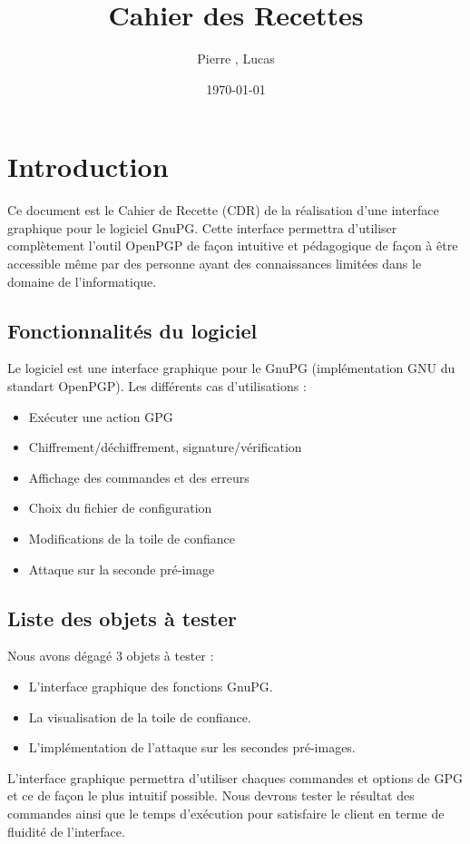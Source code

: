 \documentclass{../res/univ-projet}
\title{Cahier des Recettes}
\author{Pierre \bsc{Balmelle}, Lucas \bsc{Barbay}}
\date{\today}
\begin{document}
\maketitle
\newpage
\tableofcontents
\newpage

\section{Introduction}

Ce document est le Cahier de Recette (CDR) de la réalisation d'une interface graphique pour le logiciel GnuPG.
Cette interface permettra d'utiliser complètement l'outil OpenPGP de façon intuitive et pédagogique de façon 
à être accessible même par des personne ayant des connaissances limitées dans le domaine de l'informatique. 

\subsection{Fonctionnalités du logiciel}
Le logiciel est une interface graphique pour le GnuPG (implémentation GNU du standart OpenPGP).
Les différents cas d'utilisations :
\begin{itemize}
 \item Exécuter une action GPG
 \item Chiffrement/déchiffrement, signature/vérification
 \item Affichage des commandes et des erreurs
 \item Choix du fichier de configuration
 \item Modifications de la toile de confiance
 \item Attaque sur la seconde pré-image
\end{itemize}

\subsection{Liste des objets à tester}
Nous avons dégagé 3 objets à tester : 
\begin{itemize}
 \item L'interface graphique des fonctions GnuPG.
 \item La visualisation de la toile de confiance.
 \item L'implémentation de l'attaque sur les secondes pré-images. 
\end{itemize}

L'interface graphique permettra d'utiliser chaques commandes et options de GPG et ce de façon le plus intuitif possible. Nous
devrons tester le résultat des commandes ainsi que le temps d'exécution pour satisfaire le client en terme de fluidité de l'interface.
\end{document}
